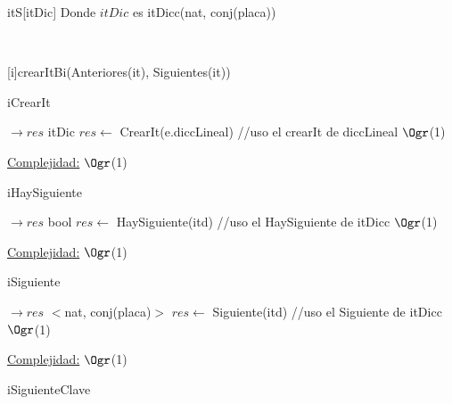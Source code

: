 \begin{Representacion}
	
	
	\begin{Estructura}{itS}[itDic]
		Donde $itDic$ es itDicc(nat, conj(placa))
	\end{Estructura}
	
	
	~
	~
	
	
	{crearItBi(Anteriores(it), Siguientes(it))}

\begin{Algoritmos}
	
	\begin{algorithm}[H]
		\caption{iCrearIt}
		
		\begin{algorithmic}[1]
			 $\to res$ itDic
			\State $res \leftarrow$ CrearIt(e.diccLineal) //uso el crearIt de diccLineal \Comment $\Ogr$(1)
			\EndProcedure 
		\end{algorithmic}
		\underline{Complejidad:} $\Ogr$(1)
	\end{algorithm}
	
	\begin{algorithm}[H]
		\caption{iHaySiguiente}
		
		\begin{algorithmic}[1]
			 $\to res$ bool
			\State $res \leftarrow$ HaySiguiente(itd) //uso el HaySiguiente de itDicc \Comment $\Ogr$(1)
			\EndProcedure 
		\end{algorithmic}
		\underline{Complejidad:} $\Ogr$(1)
	\end{algorithm}
	
	\begin{algorithm}[H]
		\caption{iSiguiente}
		
		\begin{algorithmic}[1]
			 $\to res$ $<$nat, conj(placa)$>$
			\State $res \leftarrow$ Siguiente(itd) //uso el Siguiente de itDicc \Comment $\Ogr$(1)
			\EndProcedure 
		\end{algorithmic}
		\underline{Complejidad:} $\Ogr$(1)
	\end{algorithm}
	
	\begin{algorithm}[H]
		\caption{iSiguienteClave}
		

\end{algorithm}
\end{Algoritmos}
\end{Representacion}
